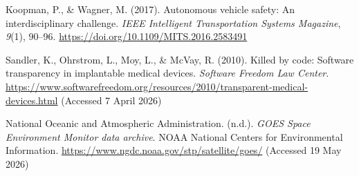 \documentclass[12pt,a4paper]{article}
\theoremstyle{plain}
\theoremstyle{definition}
\begin{document}
\begin{enumerate}[label={[\arabic*]}, leftmargin=2em, itemsep=4pt]
\item Koopman, P., \& Wagner, M. (2017). Autonomous vehicle safety: An interdisciplinary challenge. \textit{IEEE Intelligent Transportation Systems Magazine}, \textit{9}(1), 90--96. \url{https://doi.org/10.1109/MITS.2016.2583491}

\item Sandler, K., Ohrstrom, L., Moy, L., \& McVay, R. (2010). Killed by code: Software transparency in implantable medical devices. \textit{Software Freedom Law Center}. \url{https://www.softwarefreedom.org/resources/2010/transparent-medical-devices.html} (Accessed 7 April 2026)

\item National Oceanic and Atmospheric Administration. (n.d.). \textit{GOES Space Environment Monitor data archive}. NOAA National Centers for Environmental Information. \url{https://www.ngdc.noaa.gov/stp/satellite/goes/} (Accessed 19 May 2026)

\end{enumerate}
\end{document}
